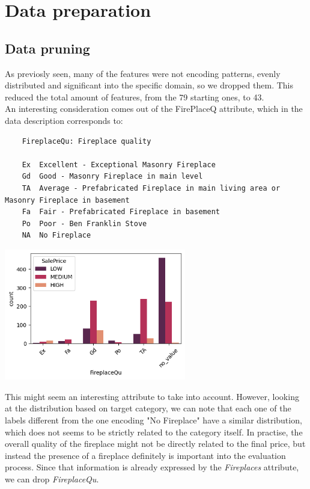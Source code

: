 \chapter{Data preparation}
\label{sec:data_preparation}

\section{Data pruning}
As previosly seen, many of the features were not encoding patterns, evenly distributed and significant into the specific domain, so we dropped them.
This reduced the total amount of features, from the 79 starting ones, to 43. \\
An interesting consideration comes out of the FirePlaceQ attribute, which in the data description corresponds to:
\begin{verbatim}
    FireplaceQu: Fireplace quality

    Ex	Excellent - Exceptional Masonry Fireplace
    Gd	Good - Masonry Fireplace in main level
    TA	Average - Prefabricated Fireplace in main living area or Masonry Fireplace in basement
    Fa	Fair - Prefabricated Fireplace in basement
    Po	Poor - Ben Franklin Stove
    NA	No Fireplace
\end{verbatim}
\begin{center}
    \includegraphics*[width=300px]{imgs/FirePlaceQu.png}
    \label{FirePlaceQu distribution}
\end{center}
This might seem an interesting attribute to take into account. However, looking at the distribution based on target category, we can note that each one of the labels different from the one encoding "No Fireplace" have a similar distribution, which does not seems to be strictly related to the category itself. 
In practise, the overall quality of the fireplace might not be directly related to the final price, but instead the presence of a fireplace definitely is important into the evaluation process. Since that information is already expressed by the \emph{Fireplaces} attribute, we can drop \emph{FireplaceQu}.

